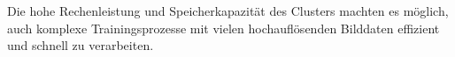 Die hohe Rechenleistung und Speicherkapazität des Clusters machten es möglich, auch komplexe Trainingsprozesse mit vielen hochauflösenden Bilddaten effizient und schnell zu verarbeiten.


